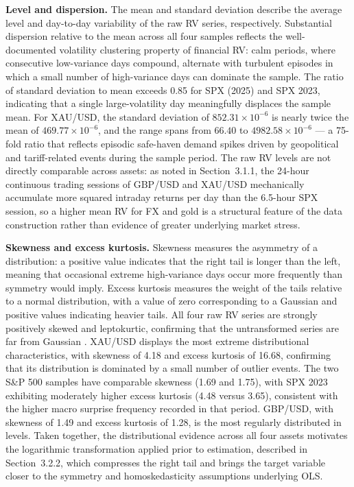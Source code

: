 \documentclass[12pt,a4paper]{report}
\begin{document}
\noindent\textbf{Level and dispersion.} The mean and standard deviation describe the average level and day-to-day variability of the raw RV series, respectively. Substantial dispersion relative to the mean across all four samples reflects the well-documented volatility clustering property of financial RV: calm periods, where consecutive low-variance days compound, alternate with turbulent episodes in which a small number of high-variance days can dominate the sample. The ratio of standard deviation to mean exceeds 0.85 for SPX (2025) and SPX 2023, indicating that a single large-volatility day meaningfully displaces the sample mean. For XAU/USD, the standard deviation of $852.31 \times 10^{-6}$ is nearly twice the mean of $469.77 \times 10^{-6}$, and the range spans from $66.40$ to $4982.58 \times 10^{-6}$ --- a 75-fold ratio that reflects episodic safe-haven demand spikes driven by geopolitical and tariff-related events during the sample period. The raw RV levels are not directly comparable across assets: as noted in Section~3.1.1, the 24-hour continuous trading sessions of GBP/USD and XAU/USD mechanically accumulate more squared intraday returns per day than the 6.5-hour SPX session, so a higher mean RV for FX and gold is a structural feature of the data construction rather than evidence of greater underlying market stress.

\noindent\textbf{Skewness and excess kurtosis.} Skewness measures the asymmetry of a distribution: a positive value indicates that the right tail is longer than the left, meaning that occasional extreme high-variance days occur more frequently than symmetry would imply. Excess kurtosis measures the weight of the tails relative to a normal distribution, with a value of zero corresponding to a Gaussian and positive values indicating heavier tails. All four raw RV series are strongly positively skewed and leptokurtic, confirming that the untransformed series are far from Gaussian \citep{Andersen2003a}. XAU/USD displays the most extreme distributional characteristics, with skewness of 4.18 and excess kurtosis of 16.68, confirming that its distribution is dominated by a small number of outlier events. The two S\&P 500 samples have comparable skewness (1.69 and 1.75), with SPX 2023 exhibiting moderately higher excess kurtosis (4.48 versus 3.65), consistent with the higher macro surprise frequency recorded in that period. GBP/USD, with skewness of 1.49 and excess kurtosis of 1.28, is the most regularly distributed in levels. Taken together, the distributional evidence across all four assets motivates the logarithmic transformation applied prior to estimation, described in Section~3.2.2, which compresses the right tail and brings the target variable closer to the symmetry and homoskedasticity assumptions underlying OLS.
\end{document}
